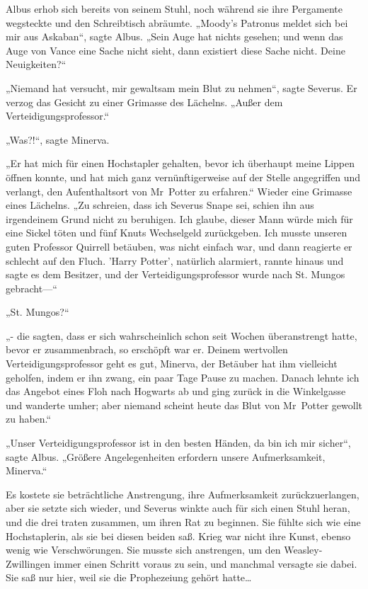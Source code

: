{Albus erhob sich bereits von seinem Stuhl, noch während sie ihre Pergamente wegsteckte und den Schreibtisch abräumte. „Moody's Patronus meldet sich bei mir aus Askaban“, sagte Albus. „Sein Auge hat nichts gesehen; und wenn das Auge von Vance eine Sache nicht sieht, dann existiert diese Sache nicht. Deine Neuigkeiten?“

„Niemand hat versucht, mir gewaltsam mein Blut zu nehmen“, sagte Severus. Er verzog das Gesicht zu einer Grimasse des Lächelns. „Außer dem Verteidigungsprofessor.“

„Was?!“, sagte Minerva.

„Er hat mich für einen Hochstapler gehalten, bevor ich überhaupt meine Lippen öffnen konnte, und hat mich ganz vernünftigerweise auf der Stelle angegriffen und verlangt, den Aufenthaltsort von Mr~Potter zu erfahren.“ Wieder eine Grimasse eines Lächelns. „Zu schreien, dass ich Severus Snape sei, schien ihn aus irgendeinem Grund nicht zu beruhigen. Ich glaube, dieser Mann würde mich für eine Sickel töten und fünf Knuts Wechselgeld zurückgeben. Ich musste unseren guten Professor Quirrell betäuben, was nicht einfach war, und dann reagierte er schlecht auf den Fluch. 'Harry Potter', natürlich alarmiert, rannte hinaus und sagte es dem Besitzer, und der Verteidigungsprofessor wurde nach St. Mungos gebracht—“

„St. Mungos?“

„- die sagten, dass er sich wahrscheinlich schon seit Wochen überanstrengt hatte, bevor er zusammenbrach, so erschöpft war er. Deinem wertvollen Verteidigungsprofessor geht es gut, Minerva, der Betäuber hat ihm vielleicht geholfen, indem er ihn zwang, ein paar Tage Pause zu machen. Danach lehnte ich das Angebot eines Floh nach Hogwarts ab und ging zurück in die Winkelgasse und wanderte umher; aber niemand scheint heute das Blut von Mr~Potter gewollt zu haben.“

„Unser Verteidigungsprofessor ist in den besten Händen, da bin ich mir sicher“, sagte Albus. „Größere Angelegenheiten erfordern unsere Aufmerksamkeit, Minerva.“

Es kostete sie beträchtliche Anstrengung, ihre Aufmerksamkeit zurückzuerlangen, aber sie setzte sich wieder, und Severus winkte auch für sich einen Stuhl heran, und die drei traten zusammen, um ihren Rat zu beginnen. Sie fühlte sich wie eine Hochstaplerin, als sie bei diesen beiden saß. Krieg war nicht ihre Kunst, ebenso wenig wie Verschwörungen. Sie musste sich anstrengen, um den Weasley-Zwillingen immer einen Schritt voraus zu sein, und manchmal versagte sie dabei. Sie saß nur hier, weil sie die Prophezeiung gehört hatte…

}
